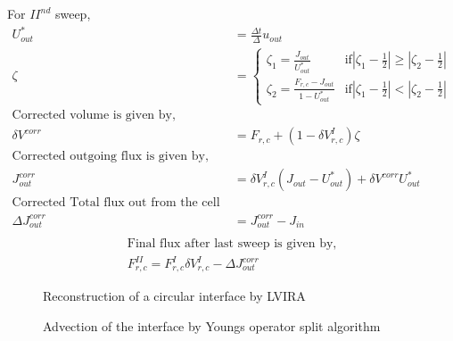 For $II^{nd}$ sweep, 
\begin{equation*}
 \begin{align}
U^*_{out}  &= \frac{\Delta t}{\Delta}u_{out} \\
 \zeta &=
\begin{cases}
 \zeta_1 = \frac{J_{out}}{U^*_{out}} & \text{if} |\zeta_1-\frac{1}{2}| \geqslant  |\zeta_2-\frac{1}{2}| \\
\zeta_2 = \frac{F_{r,c}-J_{out}}{1-U^*_{out}} & \text{if} |\zeta_1-\frac{1}{2}| <  |\zeta_2-\frac{1}{2}| 
\end{cases} \\
\text{Corrected volume is given by,} \\
\delta V^{corr} &= F_{r,c} + (1-\delta V_{r,c}^I)\zeta \\
\text{Corrected outgoing flux is given by,} \\
J_{out}^{corr} &=  \delta V_{r,c}^I (J_{out}-U^*_{out}) + \delta V^{corr} U^*_{out} \\
\text{Corrected Total flux out from the cell is given by }\\
 \Delta J_{out}^{corr} &= J_{out}^{corr} - J_{in} \\
 \end{align}
 \end{equation*}
 \begin{equation*}
 \begin{align}
 \text{Final flux after last sweep is given by,}\\
 \boxed{F_{r,c}^{II} = F_{r,c}^{I} \delta V_{r,c}^I -  \Delta J_{out}^{corr}}
 \end{align}
\end{equation*}




\begin{figure}
 \caption{Reconstruction of a circular interface by LVIRA}
\end{figure}

\begin{figure}
 \caption{Advection of the interface by Youngs operator split algorithm}
\end{figure}

